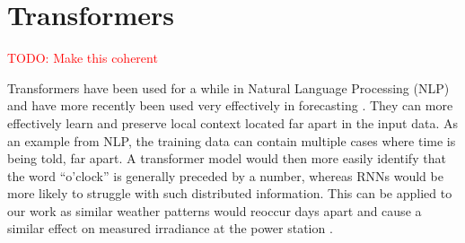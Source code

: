 \section{Transformers\label{cha:transformer}}
 \textcolor{red}{TODO: Make this coherent}
 
Transformers have been used for a while in Natural Language Processing (NLP) and have more recently been used very effectively in forecasting \cite{vaswani_attention_2017}. They can more effectively learn and preserve local context located far apart in the input data. As an example from NLP, the training data can contain multiple cases where time is being told, far apart. A transformer model would then more easily identify that the word “o’clock” is generally preceded by a number, whereas RNNs would be more likely to struggle with such distributed information. This can be applied to our work as similar weather patterns would reoccur days apart and cause a similar effect on measured irradiance at the power station \cite{lim_time_2021}.

